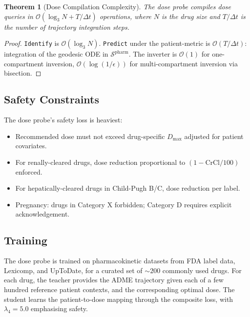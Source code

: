 \documentclass[11pt,twocolumn,a4paper]{article}
\newtheorem{theorem}{Theorem}[section]
\theoremstyle{definition}
\theoremstyle{remark}
\newcommand{\Sspace}{\mathcal{S}}
\begin{document}
\begin{theorem}[Dose Compilation Complexity]
\label{thm:dose_complexity}
The dose probe compiles dose queries in $\mathcal{O}(\log_3 N + T/\Delta t)$ operations, where $N$ is the drug size and $T/\Delta t$ is the number of trajectory integration steps.
\end{theorem}

\begin{proof}
\texttt{Identify} is $\mathcal{O}(\log_3 N)$. \texttt{Predict} under the patient-metric is $\mathcal{O}(T/\Delta t)$: integration of the geodesic ODE in $\Sspace^{\mathrm{pharm}}$. The inverter is $\mathcal{O}(1)$ for one-compartment inversion, $\mathcal{O}(\log(1/\epsilon))$ for multi-compartment inversion via bisection.
\end{proof}

\subsection{Safety Constraints}

The dose probe's safety loss is heaviest:
\begin{itemize}[nosep,leftmargin=*]
\item Recommended dose must not exceed drug-specific $D_{\max}$ adjusted for patient covariates.
\item For renally-cleared drugs, dose reduction proportional to $(1 - \mathrm{CrCl}/100)$ enforced.
\item For hepatically-cleared drugs in Child-Pugh B/C, dose reduction per label.
\item Pregnancy: drugs in Category X forbidden; Category D requires explicit acknowledgement.
\end{itemize}

\subsection{Training}

The dose probe is trained on pharmacokinetic datasets from FDA label data, Lexicomp, and UpToDate, for a curated set of $\sim\!200$ commonly used drugs. For each drug, the teacher provides the ADME trajectory given each of a few hundred reference patient contexts, and the corresponding optimal dose. The student learns the patient-to-dose mapping through the composite loss, with $\lambda_4 = 5.0$ emphasising safety.

\end{document}
